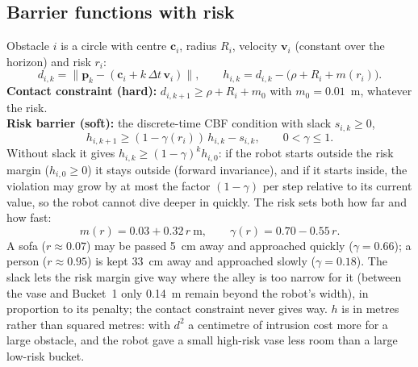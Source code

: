 \documentclass[10pt,a4paper]{article}
\begin{document}
\subsection{Barrier functions with risk}
Obstacle $i$ is a circle with centre $\bm c_i$, radius $R_i$, velocity $\bm v_i$ (constant over the horizon) and risk $r_i$:
\begin{equation}
d_{i,k} = \big\|\bm p_k - (\bm c_i + k\,\Delta t\,\bm v_i)\big\|,\qquad
h_{i,k} = d_{i,k} - \big(\rho + R_i + m(r_i)\big).
\end{equation}
\textbf{Contact constraint (hard):} $d_{i,k+1}\geq\rho+R_i+m_0$ with $m_0=0.01$~m, whatever the risk.\\
\textbf{Risk barrier (soft):} the discrete-time CBF condition with slack $s_{i,k}\geq0$,
\begin{equation}
h_{i,k+1}\geq(1-\gamma(r_i))\,h_{i,k} - s_{i,k},\qquad 0<\gamma\leq1.
\end{equation}
Without slack it gives $h_{i,k}\geq(1-\gamma)^k h_{i,0}$: if the robot starts outside the risk margin ($h_{i,0}\geq0$) it stays
outside (forward invariance), and if it starts inside, the violation may grow by at most the factor $(1-\gamma)$ per step relative
to its current value, so the robot cannot dive deeper in quickly. The risk sets both how far and how fast:
\begin{equation}
m(r) = 0.03 + 0.32\,r~\text{m},\qquad \gamma(r) = 0.70 - 0.55\,r .
\end{equation}
A sofa ($r\approx0.07$) may be passed 5~cm away and approached quickly ($\gamma=0.66$); a person ($r\approx0.95$) is kept 33~cm
away and approached slowly ($\gamma=0.18$). The slack lets the risk margin give way where the alley is too narrow for it (between
the vase and Bucket~1 only 0.14~m remain beyond the robot's width), in proportion to its penalty; the contact constraint never
gives way. $h$ is in metres rather than squared metres: with $d^2$ a centimetre of intrusion cost more for a large obstacle, and
the robot gave a small high-risk vase less room than a large low-risk bucket.
\end{document}
